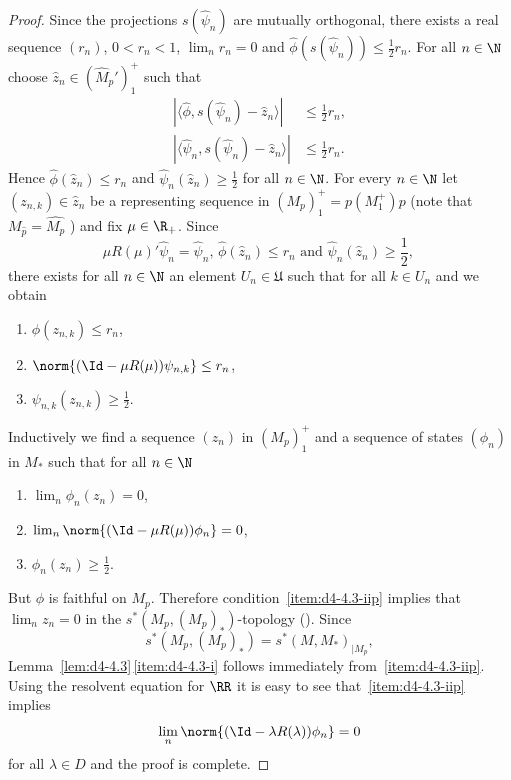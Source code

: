 \begin{proof}
Since the projections $ s(\widehat{\psi}_{n}) $  are mutually orthogonal, there exists a real sequence $ (r_{n}) $, $ 0 < r_{n} < 1 $, $ \lim_{n} r_{n} = 0 $  and $ \widehat{\phi}(s(\widehat{\psi}_{n})) \leq \frac{1}{2}r_{n} $.
For all $ n \in \N $  choose $ \widehat{z}_{n} \in (\widehat{M}_{p}')_{1}^{+} $  such that
\begin{align*}
|\langle\widehat{\phi},s(\widehat{\psi}_{n}) - \widehat{z}_{n}\rangle| &\leq \frac{1}{2}r_{n}, \\
|\langle\widehat{\psi}_{n},s(\widehat{\psi}_{n}) - \widehat{z}_{n}\rangle| &\leq \frac{1}{2}r_{n}.
\end{align*}
Hence $ \widehat{\phi}(\widehat{z}_{n}) \leq r_{n} $  and $ \widehat{\psi}_{n}(\widehat{z}_{n}) \geq \frac{1}{2} $  for all $ n \in \N $.
For every $ n \in \N $  let $ (z_{n,k}) \in \widehat{z}_{n} $  be a representing sequence in $ (M_{p})_{1}^{+} = p(M_{1}^{+})p $  (note that $ {M}_{\widehat{p}} = \widehat{M_{p}} $ ) and fix $ \mu \in \R_{+} $.
Since 
\[
\text{$\mu R(\mu)'\widehat{\psi}_{n} = \widehat{\psi}_{n}$, 
$\widehat{\phi}(\widehat{z}_{n}) \leq r_{n}$ and 
$\widehat{\psi}_{n}(\widehat{z}_{n}) \geq \frac{1}{2}$, }
\]
there exists for all $ n \in \N $  an element $ U_{n} \in \mathfrak{U} $  such that for all $ k \in U_{n} $ and we obtain
\begin{enumerate}[label=(\roman*$^{\prime}$), wide, labelindent=3em]
\item
$ \phi(z_{n,k}) \leq r_{n} $,

\item
$ \norm{(\Id - \mu R(\mu))\psi_{n,k}} \leq r_{n} $,

\item
$ \psi_{n,k}(z_{n,k}) \geq \frac{1}{2} $. 
\end{enumerate}
Inductively we find a sequence $ (z_{n}) $  in $ (M_{p})_{1}^{+} $  and a sequence of states $ (\phi_{n}) $  in $ M_{*} $  such that for all $ n \in \N $ 
\begin{enumerate}[label=(\roman*$^{\prime\prime}$), wide, labelindent=3em]
\item
$ \lim_{n} \phi_{n}(z_{n}) = 0 $, 

\item\label{item:d4-4.3-iip}
$ \lim_{n} \norm{(\Id - \mu R(\mu))\phi_{n}} = 0 $, 

\item
$ \phi_{n}(z_{n}) \geq \frac{1}{2} $.
\end{enumerate}
But $ \phi $  is faithful on $ M_{p} $.
Therefore condition~\ref{item:d4-4.3-iip} implies that $ \lim_{n} z_{n} = 0 $  in the $ s^{*}(M_{p},(M_{p})_{*}) $-topology (\textcite[Proposition III.5.4]{takesaki:1979}).
Since 
%
\[
	s^{*}(M_{p},(M_{p})_{*}) = s^{*}(M,M_{*})_{\vert M_{p}} ,
\]
%
Lemma~\ref{lem:d4-4.3}\,\ref{item:d4-4.3-i} follows immediately from~\ref{item:d4-4.3-iip}.
Using the resolvent equation for $ \RR $  it is easy to see that~\ref{item:d4-4.3-iip} implies
\[
\lim_{n} \norm{(\Id - \lambda R(\lambda))\phi_{n}} = 0
\]
for all $ \lambda \in D $  and the proof is complete.
\end{proof}
